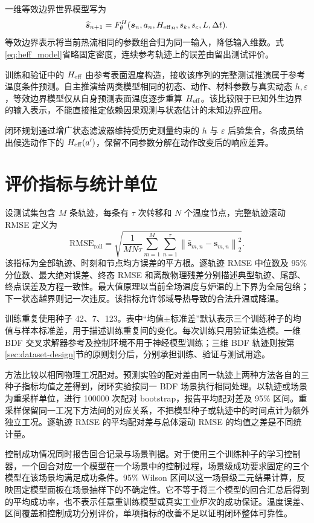 一维等效边界世界模型写为
\begin{equation}
  \widehat{\bm{s}}_{n+1}
  =F_{\theta}^{H}(\bm{s}_n,a_n,{H_{\mathrm{eff}}}_n,s_k,s_c,L,\Delta t).
  \label{eq:heff_model}
\end{equation}
等效边界表示将当前热流相同的参数组合归为同一输入，降低输入维数。式\eqref{eq:heff_model}省略固定密度，连续参考轨迹上的误差由留出测试评价。

训练和验证中的 ${H_{\mathrm{eff}}}$ 由参考表面温度构造，接收该序列的完整测试推演属于参考温度条件预测。自主推演给两类模型相同的初态、动作、材料参数与真实动态 $h,\varepsilon$，等效边界模型仅从自身预测表面温度逐步重算 ${H_{\mathrm{eff}}}$。该比较限于已知外生边界的输入表示，不能直接推定依赖因果观测与状态估计的未知边界应用。

闭环规划通过增广状态滤波器维持受历史测量约束的 $h$ 与 $\varepsilon$ 后验集合，各成员给出候选动作下的 ${H_{\mathrm{eff}}}(a')$，保留不同参数分解在动作改变后的响应差异。

\section{评价指标与统计单位}
\label{sec:evaluation-protocol}

设测试集包含 $M$ 条轨迹，每条有 $\tau$ 次转移和 $N$ 个温度节点，完整轨迹滚动 RMSE 定义为
\begin{equation}
  \mathrm{RMSE}_{\mathrm{roll}}
  =\sqrt{\frac{1}{MN\tau}\sum_{m=1}^{M}\sum_{n=1}^{\tau}
  \left\|\widehat{\bm{s}}_{m,n}-\bm{s}_{m,n}\right\|_2^2}.
\end{equation}
该指标为全部轨迹、时刻和节点均方误差的平方根。逐轨迹 RMSE 中位数及 95\% 分位数、最大绝对误差、终态 RMSE 和离散物理残差分别描述典型轨迹、尾部、终点误差及方程一致性。最大值原理以当前全场温度与炉温的上下界为全局包络；下一状态越界则记一次违反。该指标允许邻域导热导致的合法升温或降温。

训练重复使用种子 42、7、123。表中“均值$\pm$标准差”默认表示三个训练种子的均值与样本标准差，用于描述训练重复间的变化。每次训练只用验证集选模。一维 BDF 交叉求解器参考及控制环境不用于神经模型训练；三维 BDF 轨迹则按第\ref{sec:dataset-design}节的原则划分后，分别承担训练、验证与测试用途。

方法比较以相同物理工况配对。预测实验的配对差由同一轨迹上两种方法各自的三种子指标均值之差得到，闭环实验按同一 BDF 场景执行相同处理。以轨迹或场景为重采样单位，进行 100000 次配对 bootstrap，报告平均配对差及 95\% 区间。重采样保留同一工况下方法间的对应关系，不把模型种子或轨迹中的时间点计为额外独立工况。逐轨迹 RMSE 的平均配对差与总体滚动 RMSE 的均值之差是不同统计量。

控制成功情况同时报告回合记录与场景判据。对于使用三个训练种子的学习控制器，一个回合对应一个模型在一个场景中的控制过程，场景级成功要求固定的三个模型在该场景均满足成功条件。95\% Wilson 区间以这一场景级二元结果计算，反映固定模型面板在场景抽样下的不确定性。它不等于将三个模型的回合汇总后得到的平均成功率，也不表示任意重训练模型或真实工业炉次的成功保证。温度误差、区间覆盖和控制成功分别评价，单项指标的改善不足以证明闭环整体可靠性。
